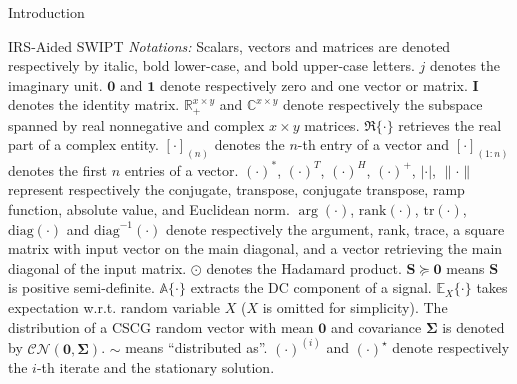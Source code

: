 \documentclass[journal]{IEEEtran}
\begin{document}
\begin{section}{Introduction}
\begin{subsection}{IRS-Aided SWIPT}
			\emph{Notations:} Scalars, vectors and matrices are denoted respectively by italic, bold lower-case, and bold upper-case letters. $j$ denotes the imaginary unit. $\boldsymbol{0}$ and $\boldsymbol{1}$ denote respectively zero and one vector or matrix. $\boldsymbol{I}$ denotes the identity matrix. $\mathbb{R}_+^{x \times y}$ and $\mathbb{C}^{x \times y}$ denote respectively the subspace spanned by real nonnegative and complex $x \times y$ matrices. $\Re\{\cdot\}$ retrieves the real part of a complex entity. $[\cdot]_{(n)}$ denotes the $n$-th entry of a vector and $[\cdot]_{(1:n)}$ denotes the first $n$ entries of a vector. $(\cdot)^*$, $(\cdot)^T$, $(\cdot)^H$, $(\cdot)^+$, $\lvert{\cdot}\rvert$, $\lVert{\cdot}\rVert$ represent respectively the conjugate, transpose, conjugate transpose, ramp function, absolute value, and Euclidean norm. $\arg(\cdot)$, $\mathrm{rank}(\cdot)$, $\mathrm{tr}(\cdot)$, $\mathrm{diag}(\cdot)$ and $\mathrm{diag}^{-1}(\cdot)$ denote respectively the argument, rank, trace, a square matrix with input vector on the main diagonal, and a vector retrieving the main diagonal of the input matrix. $\odot$ denotes the Hadamard product. $\boldsymbol{S} \succeq \boldsymbol{0}$ means $\boldsymbol{S}$ is positive semi-definite. $\mathbb{A}\{\cdot\}$ extracts the DC component of a signal. $\mathbb{E}_X\{\cdot\}$ takes expectation w.r.t. random variable $X$ ($X$ is omitted for simplicity). The distribution of a CSCG random vector with mean $\boldsymbol{0}$ and covariance $\boldsymbol{\Sigma}$ is denoted by $\mathcal{CN}(\boldsymbol{0},\boldsymbol{\Sigma})$. $\sim$ means ``distributed as''. $(\cdot)^{(i)}$ and $(\cdot)^{\star}$ denote respectively the $i$-th iterate and the stationary solution.
		\end{subsection}
	\end{section}
\end{document}
